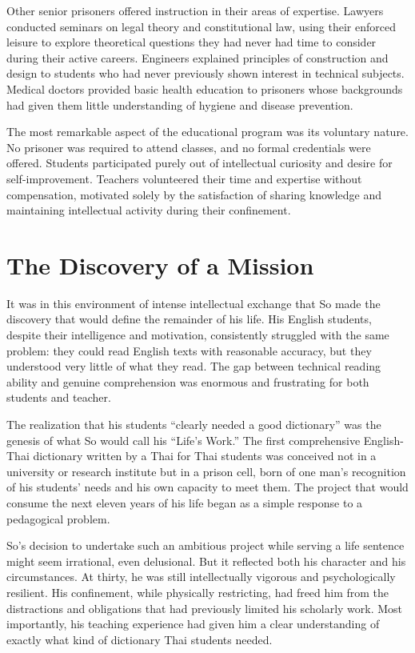\documentclass[
  Letterpaper,
]{scrbook}
\begin{document}
Other senior prisoners offered instruction in their areas of expertise.
Lawyers conducted seminars on legal theory and constitutional law, using
their enforced leisure to explore theoretical questions they had never
had time to consider during their active careers. Engineers explained
principles of construction and design to students who had never
previously shown interest in technical subjects. Medical doctors
provided basic health education to prisoners whose backgrounds had given
them little understanding of hygiene and disease prevention.

The most remarkable aspect of the educational program was its voluntary
nature. No prisoner was required to attend classes, and no formal
credentials were offered. Students participated purely out of
intellectual curiosity and desire for self-improvement. Teachers
volunteered their time and expertise without compensation, motivated
solely by the satisfaction of sharing knowledge and maintaining
intellectual activity during their confinement.

\section{The Discovery of a Mission}\label{the-discovery-of-a-mission}

It was in this environment of intense intellectual exchange that So made
the discovery that would define the remainder of his life. His English
students, despite their intelligence and motivation, consistently
struggled with the same problem: they could read English texts with
reasonable accuracy, but they understood very little of what they read.
The gap between technical reading ability and genuine comprehension was
enormous and frustrating for both students and teacher.

The realization that his students ``clearly needed a good dictionary''
was the genesis of what So would call his ``Life's Work.'' The first
comprehensive English-Thai dictionary written by a Thai for Thai
students was conceived not in a university or research institute but in
a prison cell, born of one man's recognition of his students' needs and
his own capacity to meet them. The project that would consume the next
eleven years of his life began as a simple response to a pedagogical
problem.

So's decision to undertake such an ambitious project while serving a
life sentence might seem irrational, even delusional. But it reflected
both his character and his circumstances. At thirty, he was still
intellectually vigorous and psychologically resilient. His confinement,
while physically restricting, had freed him from the distractions and
obligations that had previously limited his scholarly work. Most
importantly, his teaching experience had given him a clear understanding
of exactly what kind of dictionary Thai students needed.
\end{document}
